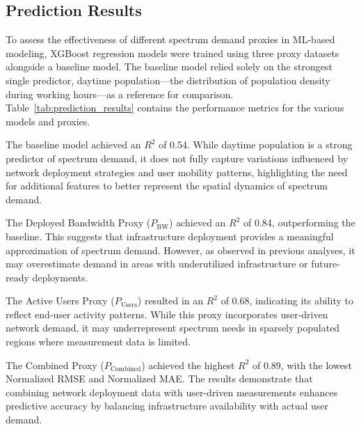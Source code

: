 \documentclass[conference]{IEEEtran}
\begin{document}
\subsection{Prediction Results}

To assess the effectiveness of different spectrum demand proxies in ML-based modeling, XGBoost regression models were trained using three proxy datasets alongside a baseline model. The baseline model relied solely on the strongest single predictor, daytime population—the distribution of population density during working hours—as a reference for comparison. Table~\ref{tab:prediction_results} contains the performance metrics for the various models and proxies.

The baseline model achieved an \( R^2 \) of 0.54. While daytime population is a strong predictor of spectrum demand, it does not fully capture variations influenced by network deployment strategies and user mobility patterns, highlighting the need for additional features to better represent the spatial dynamics of spectrum demand.


  
The Deployed Bandwidth Proxy (\( P_{\text{BW}} \)) achieved an \( R^2 \) of 0.84, outperforming the baseline. This suggests that infrastructure deployment provides a meaningful approximation of spectrum demand. However, as observed in previous analyses, it may overestimate demand in areas with underutilized infrastructure or future-ready deployments.

The Active Users Proxy (\( P_{\text{Users}} \)) resulted in an \( R^2 \) of 0.68, indicating its ability to reflect end-user activity patterns. While this proxy incorporates user-driven network demand, it may underrepresent spectrum needs in sparsely populated regions where measurement data is limited.

The Combined Proxy (\( P_{\text{Combined}} \)) achieved the highest \( R^2 \) of 0.89, with the lowest Normalized RMSE and Normalized MAE. The results demonstrate that combining network deployment data with user-driven measurements enhances predictive accuracy by balancing infrastructure availability with actual user demand.



\begin{table}[ht]
\centering
\caption{Prediction Performance Metrics for Different Proxies}
\label{tab:prediction_results}
\end{table}
\end{document}
